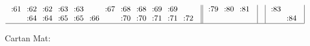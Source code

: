 \documentclass[12pt,a4paper]{amsart}
\begin{document}
\begin{align*}
\begin{array}{r||c|c|c|c|c|c|c}
\begin{array}{cccccccccccc}
\llap:61&\llap:62&\llap:62&\llap:63&\llap:63&&\llap:67&\llap:68&\llap:68&\llap:69&\llap:69\\
&\llap:64&\llap:64&\llap:65&\llap:65&\llap:66&&\llap:70&\llap:70&\llap:71&\llap:71&\llap:72\\
  \end{array}
&
  \begin{array}{ccc}
    \llap:79&\llap:80&\llap:81\\
    \\
  \end{array}
&
&
  \begin{array}{cc}
    \llap:83&\\
    &\llap:84\\
  \end{array}
\\\hline
  \end{array}
\end{align*}

\newpage
\normalsize {}
Cartan Mat:
\end{document}
